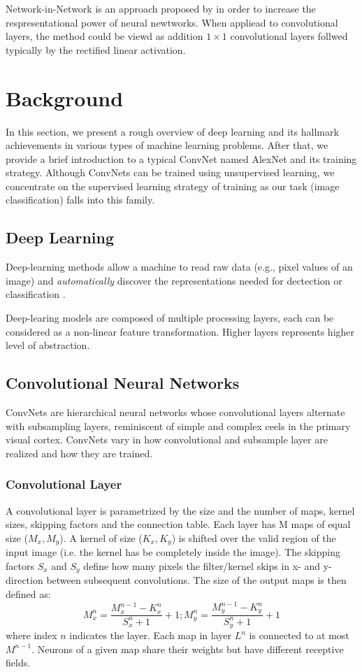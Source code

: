 \documentclass{sig-alternate}
\begin{document}
Network-in-Network is an approach proposed by \citep{DBLP:journals/corr/LinCY13} in order to increase the respresentational power of neural newtworks. When appliead to convolutional layers, the method could be viewd as addition $1\times1$ convolutional layers follwed typically by the rectified linear activation. 

\section{Background}
In this section, we present a rough overview of deep learning and its hallmark achievements in various types of machine learning problems. After that, we provide a brief introduction to a typical ConvNet named AlexNet \citep{NIPS2012_4824} and its training strategy. Although ConvNets can be trained using unsupervised learning, we concentrate on the supervised learning strategy of training as our task (image classification) falls into this family.
\subsection{Deep Learning}
Deep-learning methods allow a machine to read raw data (e.g., pixel values of an image) and \emph{automatically} discover the representations needed for dectection or classification \citep{lecun:deeplearning}.

Deep-learing models are composed of multiple processing layers, each can be considered as a non-linear feature transformation. Higher layers represents higher level of abstraction. 
\subsection{Convolutional Neural Networks}
ConvNets are hierarchical neural networks whose convolutional layers alternate with subsampling layers, reminiscent of simple and complex ceels in the primary visual cortex. ConvNets vary in how convolutional and subsample layer are realized and how they are trained.
       \subsubsection{Convolutional Layer}
       A convolutional layer is parametrized by the size and the number of maps, kernel sizes, skipping factors and the connection table. Each layer has M maps of equal size ($M_x, M_y$). A kernel of size ($K_x, K_y$) is shifted over the valid region of the input image (i.e. the kernel has be completely inside the image). The skipping factors $S_x$ and $S_y$ define how many pixels the filter/kernel skips in x- and y-direction between subsequent convolutions. The size of the output maps is then defined as:
       \begin{equation}
              M^n_x=\frac{M^{n-1}_x - K^n_x}{S^n_x + 1}+1; M^n_y=\frac{M^{n-1}_y - K^n_y}{S^n_y + 1}+1
       \end{equation}
       where index $n$ indicates the layer. Each map in layer $L^n$ is connected to at most $M^{n-1}$. Neurons of a given map share their weights but have different receptive fields.
\end{document}

